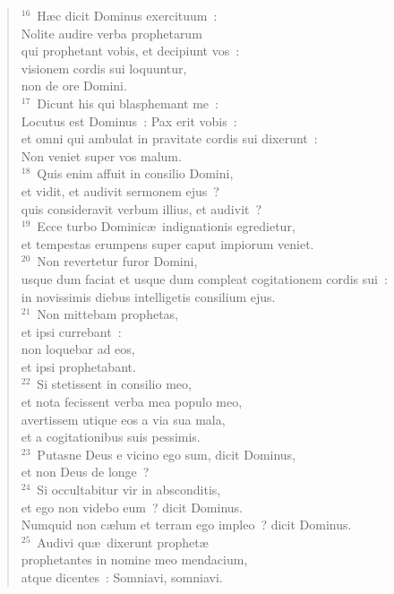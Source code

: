 \begin{flushleft}
\begin{verse}
${}^{16}$~H\ae c dicit Dominus exercituum~:\\ Nolite audire verba prophetarum\\ qui prophetant vobis, et decipiunt vos~:\\ visionem cordis sui loquuntur,\\ non de ore Domini.\\
${}^{17}$~Dicunt his qui blasphemant me~:\\ Locutus est Dominus~: Pax erit vobis~:\\ et omni qui ambulat in pravitate cordis sui dixerunt~:\\ Non veniet super vos malum.\\
${}^{18}$~Quis enim affuit in consilio Domini,\\ et vidit, et audivit sermonem ejus~?\\ quis consideravit verbum illius, et audivit~?\\
${}^{19}$~Ecce turbo Dominic\ae\ indignationis egredietur,\\ et tempestas erumpens super caput impiorum veniet.\\
${}^{20}$~Non revertetur furor Domini,\\ usque dum faciat et usque dum compleat cogitationem cordis sui~:\\ in novissimis diebus intelligetis consilium ejus.\\
${}^{21}$~Non mittebam prophetas,\\ et ipsi currebant~:\\ non loquebar ad eos,\\ et ipsi prophetabant.\\
${}^{22}$~Si stetissent in consilio meo,\\ et nota fecissent verba mea populo meo,\\ avertissem utique eos a via sua mala,\\ et a cogitationibus suis pessimis.\\
${}^{23}$~Putasne Deus e vicino ego sum, dicit Dominus,\\ et non Deus de longe~?\\
${}^{24}$~Si occultabitur vir in absconditis,\\ et ego non videbo eum~? dicit Dominus.\\ Numquid non c\ae lum et terram ego impleo~? dicit Dominus.\\
${}^{25}$~Audivi qu\ae\ dixerunt prophet\ae \\ prophetantes in nomine meo mendacium,\\ atque dicentes~: Somniavi, somniavi.\\

\end{verse}
\end{flushleft}
